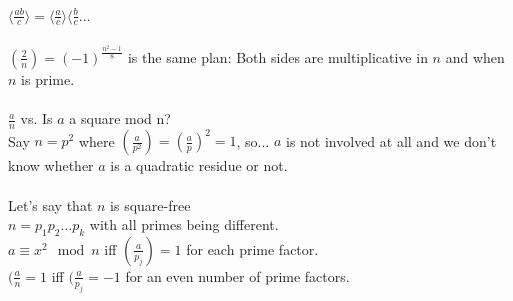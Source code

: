     $\langle \frac{ab}{c} \rangle = \langle\frac{a}{c}\rangle 
    \langle\frac{b}{c} \ldots$\\\\
    $(\frac{2}{n}) = (-1)^{\frac{n^2 - 1}{8}}$ is the same plan: Both sides
    are multiplicative in $n$ and when $n$ is prime.\\\\
    $\frac{a}{n}$ vs. Is $a$ a square mod n?\\
    Say $n = p^2$ where $(\frac{a}{p^2}) = (\frac{a}{p})^2 = 1$, so... $a$ is
    not involved at all and we don't know whether $a$ is a quadratic residue
    or not.\\\\
    Let's say that $n$ is square-free\\
    $n = p_1p_2 \ldots p_k$ with all primes being different.\\
    $a \equiv x^2 \mod n$ iff $(\frac{a}{p_j}) = 1$ for each prime factor.\\
    $(\frac{a}{n} = 1$ iff $(\frac{a}{p_j} = -1$ for an even number of prime
    factors.\\

